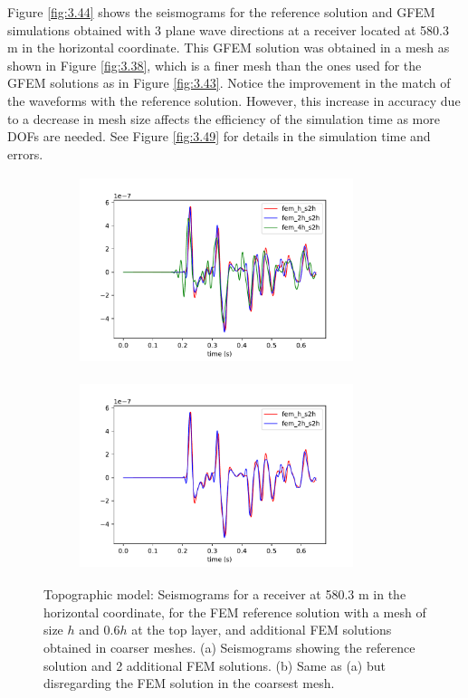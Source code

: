 Figure \ref{fig:3.44} shows the seismograms for the reference solution and GFEM simulations obtained with 3 plane wave directions at a receiver located at 580.3 m in the horizontal coordinate. This GFEM solution was obtained in a mesh as shown in Figure \ref{fig:3.38}, which is a finer mesh than the ones used for the GFEM solutions as in Figure \ref{fig:3.43}. Notice the improvement in the match of the waveforms with the reference solution. However, this increase in accuracy due to a decrease in mesh size affects the efficiency of the simulation time as more DOFs are needed. See Figure \ref{fig:3.49} for details in the simulation time and errors.

 \begin{figure}[h!]
 		\centering
		\begin{subfigure}{8cm}
				\includegraphics[width=8cm, height=5.5cm]{Thesis_Edith/figures/topo/topo_waves/fem_topo_tr75.pdf}
			     \caption{}
		\end{subfigure}
        \hspace{0.25cm}	
		\begin{subfigure}{8cm}
				\includegraphics[width=8cm, height=5.5cm]{Thesis_Edith/figures/topo/topo_waves/fem_topo2h_tr75.pdf}
			   \caption{}
		\end{subfigure}
 
	\caption{Topographic model: Seismograms for a receiver at 580.3 m in the horizontal coordinate, for the FEM reference solution with a mesh of size $h$ and $0.6 h$ at the top layer, and  additional FEM solutions obtained in coarser meshes. (a) Seismograms showing the reference solution and 2 additional FEM solutions. (b) Same as (a) but disregarding the FEM solution in the coarsest mesh.}
	\label{fig:3.42}
\end{figure}


